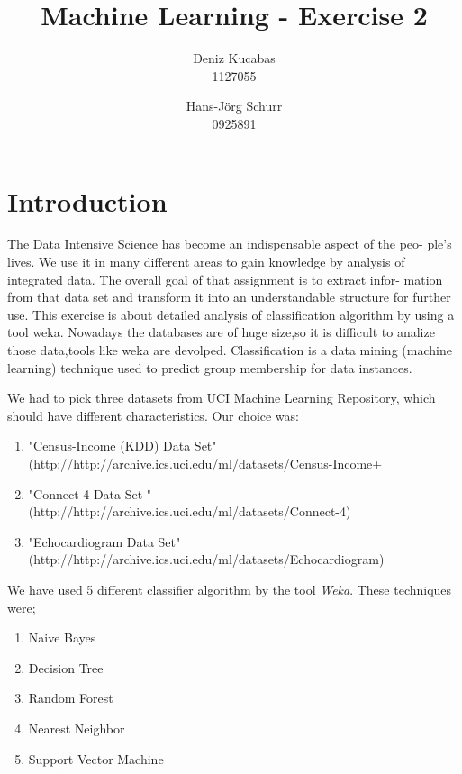 \documentclass[a4paper]{article}
\begin{document}
\title{Machine Learning - Exercise 2 }
\author{
        Deniz Kucabas \\ 
                     1127055 
                    \and
                    Hans-Jörg Schurr \\ 0925891
}

\maketitle
\tableofcontents
\newpage

\section{Introduction}
The Data Intensive Science has become an indispensable aspect of the peo-
ple's lives. We use it in many different areas to gain knowledge by analysis
of integrated data. The overall goal of that assignment is to extract infor-
mation from that data set and transform it into an understandable structure
for further use. This exercise is about detailed analysis of classification algorithm by using a tool weka.
Nowadays the databases are of huge size,so it is difficult to analize those data,tools like weka are 
devolped. Classification is a data mining (machine learning) technique used 
to predict group membership for data instances. 

We had to pick three datasets from UCI Machine Learning Repository, which should have different characteristics. 
Our choice was:
\begin{enumerate}
    \item "Census-Income (KDD) Data Set" \\ 
(http://http://archive.ics.uci.edu/ml/datasets/Census-Income+%
    \item "Connect-4 Data Set " \\
        (http://http://archive.ics.uci.edu/ml/datasets/Connect-4)
    \item "Echocardiogram  Data Set" \\
        (http://http://archive.ics.uci.edu/ml/datasets/Echocardiogram)
\end{enumerate}

We have used 5 different classifier algorithm by the tool \emph{Weka}. 
These techniques were;
\begin{enumerate}
    \item Naive Bayes
    \item Decision Tree
    \item Random Forest
    \item Nearest Neighbor
    \item Support Vector Machine
\end{enumerate}
\end{document}
